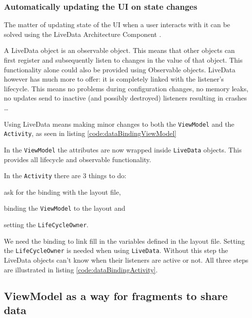 \subsubsection{Automatically updating the UI on state changes}
The matter of updating state of the UI when a user interacts with it can be solved using the LiveData Architecture Component \cite{liveData}.

A LiveData object is an observable object. This means that other objects can first register and subsequently listen to changes in the value of that object.
This functionality alone could also be provided using Observable objects\cite{observable}.
LiveData however has much more to offer: it is completely linked with the listener's lifecycle. This means no problems during configuration changes, no memory leaks, no updates send to inactive (and possibly destroyed) listeners resulting in crashes \ldots

Using LiveData means making minor changes to both the \lstinline!ViewModel! and the \lstinline!Activity!, as seen in listing \ref{code:dataBindingViewModel}

In the \lstinline!ViewModel! the attributes are now wrapped inside \lstinline!LiveData! objects.
This provides all lifecycle and observable functionality. 



In the \lstinline!Activity! there are 3 things to do:
\begin{inparaenum}[(i)]
	\item ask for the binding with the layout file,
	\item binding the \lstinline!ViewModel! to the layout and
	\item setting the \lstinline!LifeCycleOwner!.
\end{inparaenum}

We need the binding to link fill in the variables defined in the layout file. 
Setting the \lstinline!LifeCycleOwner! is needed when using \lstinline!LiveData!. 
Without this step the LiveData objects can't know when their listeners are active or not. All three steps are illustrated in listing \ref{code:dataBindingActivity}.




\subsection{ViewModel as a way for fragments to share data}
